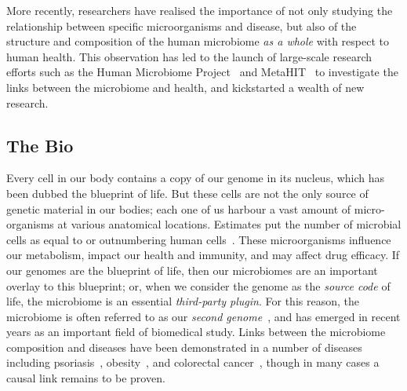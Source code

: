 \begin{justify}
More recently, researchers have realised the importance of not only studying the relationship between specific microorganisms and disease, but also of the structure and composition of the human microbiome \emph{as a whole} with respect to human health. This observation has led to the launch of large-scale research efforts such as the Human Microbiome Project~\cite{turnbaugh2007human} and MetaHIT~\cite{ehrlich2011metahit} to investigate the links between the microbiome and health, and kickstarted a wealth of new research.


\subsection{The Bio}

Every cell in our body contains a copy of our genome in its nucleus, which has been dubbed the blueprint of life. But these cells are not the only source of genetic material in our bodies; each one of us harbour a vast amount of micro-organisms at various anatomical locations. %
Estimates put the number of microbial cells as equal to or outnumbering human cells~\cite{sender2016outnumbered}. These microorganisms influence our metabolism, impact our health and immunity, and may affect drug efficacy. If our genomes are the blueprint of life, then our microbiomes are an important overlay to this blueprint; or, when we consider the genome as the \emph{source code} of life, the microbiome is an essential \emph{third-party plugin}. For this reason, the microbiome is often referred to as our \emph{second genome}~\cite{grice2012microbiome}, and has emerged in recent years as an important field of biomedical study. Links between the microbiome composition and diseases have been demonstrated in a number of diseases~\cite{cho2012human} including psoriasis~\cite{gao2008substantial}, obesity~\cite{turnbaugh2006obesity, ley2005obesity}, and colorectal cancer~\cite{castellarin2012fusobacterium,kostic2012genomic}, though in many cases a causal link remains to be proven.


\end{justify}
